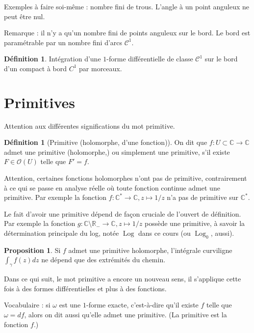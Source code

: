 \documentclass[11pt,a4paper]{book}
\newcommand{\R}{\mathbb{R}}
\newcommand{\C}{\mathbb{C}}
\theoremstyle{definition}
\newtheorem{proposition}[theoreme]{Proposition}
\newtheorem{definition}[theoreme]{D\'efinition}
\theoremstyle{plain}
\begin{document}
Exemples à faire soi-même : nombre fini de trous. L'angle à un point anguleux ne peut être nul.  

Remarque : il n'y a qu'un nombre fini de points anguleux sur le bord. Le bord est paramétrable par un nombre fini d'arcs $\mathcal C^1$.

\begin{definition}
Intégration d'une $1$-forme différentielle de classe $\mathcal C^1$ sur le bord d'un compact à bord $C^1$ par morceaux.
\end{definition}

\section{Primitives}

Attention aux différentes significations du mot \og primitive\fg. 

\begin{definition}[Primitive (holomorphe, d'une fonction)]
On dit que $f : U\subset \C\to \C$ admet une primitive (holomorphe,) ou simplement une primitive, s'il existe $F \in \mathcal O(U)$ telle que $F'=f$.
\end{definition}


Attention, certaines fonctions holomorphes n'ont pas de primitive, contrairement à ce qui se passe en analyse réelle où toute fonction continue admet une primitive. 
Par exemple la fonction $f:\C^*\to \C, z\mapsto 1/z$ n'a pas de primitive sur $\C^*$. 

Le fait d'avoir une primitive dépend de façon cruciale de l'ouvert de définition. Par exemple la fonction $g : \C\setminus \R_- \to \C, z\mapsto 1/z$ possède une primitive, à savoir la détermination principale du log, notée $\operatorname{Log}$ dans ce cours (ou $\operatorname{Log}_0$, aussi).


\begin{proposition}
Si $f$ admet une primitive holomorphe, l'intégrale curviligne $\int_\gamma f(z)dz$ ne dépend que des extrémités du chemin.
\end{proposition}

Dans ce qui suit, le mot \og primitive\fg{} a encore un nouveau sens, il s'applique cette fois à des formes différentielles et plus à des fonctions.

Vocabulaire : si $\omega$ est une $1$-forme exacte,  c'est-à-dire qu'il existe $f$ telle que $\omega=df$, alors on dit aussi qu'elle admet une primitive. (La primitive est la fonction $f$.)
\end{document}
